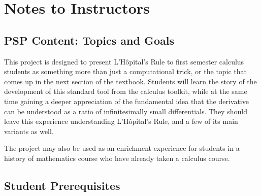 \documentclass[11pt]{article}
\begin{document}
\nocite{*}%
 
      {}                                                                                             %

\newpage



\section*{Notes to Instructors}

  \vspace*{-6pt}
\subsection*{PSP Content: Topics and Goals}


  \vspace*{-3pt}
This project is designed to present L'H\^opital's Rule to first semester calculus students as something more than just a computational trick, or the topic that comes up in the next section of the textbook. Students will learn the story of the development of this standard tool from the calculus toolkit, while at the same time gaining a deeper appreciation of the fundamental idea that the derivative can be understood as a ratio of infinitesimally small differentials. They should leave this experience understanding L'H\^opital's Rule, and a few of its main variants as well.

The project may also be used as an enrichment experience for students in a history of mathematics course who have already taken a calculus course.

  \vspace*{-6pt}

\subsection*{Student Prerequisites}
\end{document}
